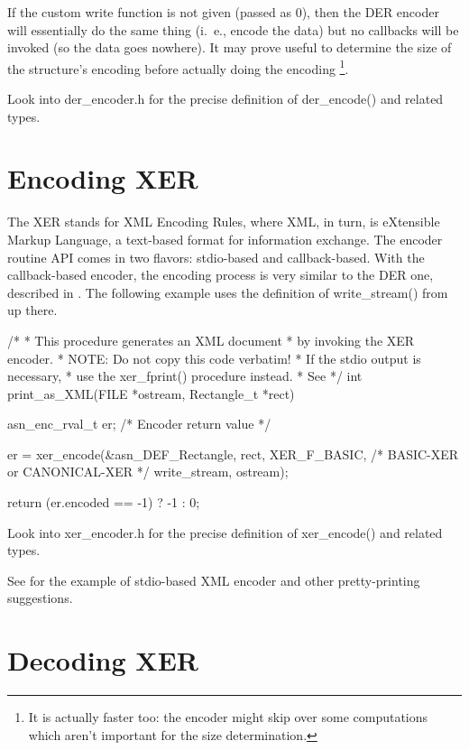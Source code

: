 \documentclass[english,oneside,12pt]{book}
\begin{document}
If the custom write function is not given (passed as 0), then the
DER encoder will essentially do the same thing (i.~e., encode the data)
but no callbacks will be invoked (so the data goes nowhere). It may
prove useful to determine the size of the structure's encoding before
actually doing the encoding%
\footnote{It is actually faster too: the encoder might skip over some computations
which aren't important for the size determination.%
}.

Look into der\_encoder.h for the precise definition of der\_encode()
and related types.


\section{\label{sec:Encoding-XER}Encoding XER}

The XER stands for XML Encoding Rules, where XML, in turn, is eXtensible
Markup Language, a text-based format for information exchange. The
encoder routine API comes in two flavors: stdio-based and callback-based.
With the callback-based encoder, the encoding process is very similar
to the DER one, described in . The
following example uses the definition of write\_stream() from up there.
\begin{codesample}
/*
 * This procedure generates an XML document
 * by invoking the XER encoder.
 * NOTE: Do not copy this code verbatim!
 *       If the stdio output is necessary,
 *       use the xer_fprint() procedure instead.
 *       See %
 */
int
print_as_XML(FILE *ostream, Rectangle_t *rect) {
    asn_enc_rval_t er;  /* Encoder return value */

    er = xer_encode(&asn_DEF_Rectangle, rect,
        XER_F_BASIC, /* BASIC-XER or CANONICAL-XER */
        write_stream, ostream);

    return (er.encoded == -1) ? -1 : 0;
}
\end{codesample}
Look into xer\_encoder.h for the precise definition of xer\_encode()
and related types.

See  for the example of stdio-based
XML encoder and other pretty-printing suggestions.


\section{\label{sec:Decoding-XER}Decoding XER}
\end{document}
